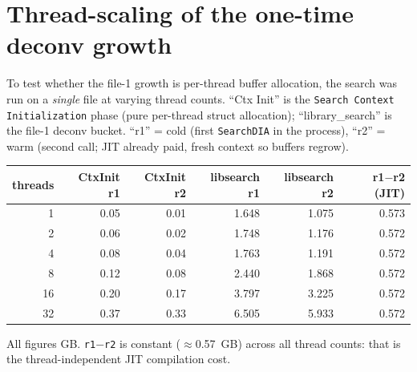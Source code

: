 \documentclass[11pt]{article}
\begin{document}
\section{Thread-scaling of the one-time deconv growth}\label{sec:threadscale}
To test whether the file-1 growth is per-thread buffer allocation, the search was run
on a \emph{single} file at varying thread counts. ``Ctx Init'' is the
\texttt{Search Context Initialization} phase (pure per-thread struct allocation);
``library\_search'' is the file-1 deconv bucket. ``r1'' = cold (first \texttt{SearchDIA}
in the process), ``r2'' = warm (second call; JIT already paid, fresh context so buffers
regrow).
\begin{center}
\begin{tabular}{rrrrrr}
\toprule
threads & CtxInit r1 & CtxInit r2 & libsearch r1 & libsearch r2 & r1$-$r2 (JIT) \\
\midrule
1  & 0.05 & 0.01 & 1.648 & 1.075 & 0.573 \\
2  & 0.06 & 0.02 & 1.748 & 1.176 & 0.572 \\
4  & 0.08 & 0.04 & 1.763 & 1.191 & 0.572 \\
8  & 0.12 & 0.08 & 2.440 & 1.868 & 0.572 \\
16 & 0.20 & 0.17 & 3.797 & 3.225 & 0.572 \\
32 & 0.37 & 0.33 & 6.505 & 5.933 & 0.572 \\
\bottomrule
\end{tabular}
\end{center}
All figures GB. \texttt{r1$-$r2} is constant ($\approx$\SI{0.57}{GB}) across all thread
counts: that is the thread-independent JIT compilation cost.

\begin{center}
\end{center}
\end{document}
